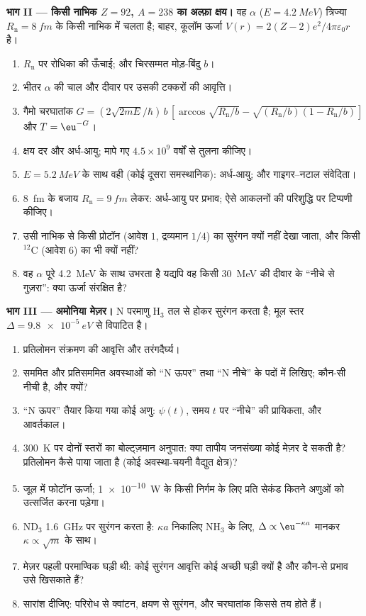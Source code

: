 \begin{problem}[{सप्ताहांत समस्या --- तीन सुरंगें}]
\textbf{भाग II --- किसी नाभिक $Z = 92$, $A = 238$ का अल्फ़ा क्षय।}
वह $\alpha$ ($E = \qty{4.2}{MeV}$) त्रिज्या $R_{\text{n}} = \qty{8}{fm}$ के किसी
नाभिक में चलता है; बाहर, कूलॉम ऊर्जा $V(r) =
2(Z - 2)e^2/4\pi\varepsilon_0r$ है।
\begin{enumerate}[resume]
  \item $R_{\text{n}}$ पर रोधिका की ऊँचाई; और चिरसम्मत मोड़-बिंदु
        $b$।
  \item भीतर $\alpha$ की चाल और दीवार पर उसकी टक्करों की
        आवृत्ति।
  \item गैमो चरघातांक $G = (2\sqrt{2mE}/\hbar)\,b\,[\arccos\sqrt{R_{\text{n}}/b}
        - \sqrt{(R_{\text{n}}/b)(1 - R_{\text{n}}/b)}]$ और $T = \eu^{-G}$।
  \item क्षय दर और अर्ध-आयु; मापे गए $4.5 \times
        10^9$ वर्षों से तुलना कीजिए।
  \item $E = \qty{5.2}{MeV}$ के साथ वही (कोई दूसरा समस्थानिक): अर्ध-आयु;
        और गाइगर--नटाल संवेदिता।
  \item \qty{8}{fm} के बजाय $R_{\text{n}} = \qty{9}{fm}$ लेकर:
        अर्ध-आयु पर प्रभाव; ऐसे आकलनों की परिशुद्धि पर टिप्पणी कीजिए।
  \item उसी नाभिक से किसी प्रोटॉन (आवेश $1$, द्रव्यमान $1/4$) का
        सुरंगन क्यों नहीं देखा जाता, और किसी $^{12}$C
        (आवेश $6$) का भी क्यों नहीं?
  \item वह $\alpha$ पूरे \qty{4.2}{MeV} के साथ उभरता है यद्यपि वह
        किसी \qty{30}{MeV} की दीवार के ``नीचे से गुज़रा'': क्या ऊर्जा संरक्षित है?
\end{enumerate}

\textbf{भाग III --- अमोनिया मेज़र।}
N परमाणु H$_3$ तल से होकर सुरंगन करता है; मूल स्तर
$\Delta = \qty{9.8e-5}{eV}$ से विपाटित है।
\begin{enumerate}[resume]
  \item प्रतिलोमन संक्रमण की आवृत्ति और तरंगदैर्घ्य।
  \item सममित और प्रतिसममित अवस्थाओं को ``N ऊपर'' तथा ``N नीचे''
        के पदों में लिखिए; कौन-सी नीची है, और क्यों?
  \item ``N ऊपर'' तैयार किया गया कोई अणु: $\psi(t)$, समय $t$ पर
        ``नीचे'' की प्रायिकता, और आवर्तकाल।
  \item \qty{300}{K} पर दोनों स्तरों का बोल्ट्ज़मान अनुपात: क्या
        तापीय जनसंख्या कोई मेज़र दे सकती है? प्रतिलोमन कैसे पाया जाता है
        (कोई अवस्था-चयनी वैद्युत क्षेत्र)?
  \item जूल में फोटॉन ऊर्जा; \qty{1e-10}{W} के किसी निर्गम के लिए प्रति सेकंड
        कितने अणुओं को उत्सर्जित करना पड़ेगा।
  \item ND$_3$ \qty{1.6}{GHz} पर सुरंगन करता है: $\kappa a$ निकालिए NH$_3$ के
        लिए, $\Delta \propto \eu^{-\kappa a}$ मानकर $\kappa \propto \sqrt{m}$ के साथ।
  \item मेज़र पहली परमाण्विक घड़ी थी: कोई सुरंगन आवृत्ति
        कोई अच्छी घड़ी क्यों है और कौन-से प्रभाव उसे खिसकाते हैं?
  \item सारांश दीजिए: परिरोध से क्वांटन, क्षयण से सुरंगन,
        और चरघातांक किससे तय होते हैं।
\end{enumerate}
\end{problem}
